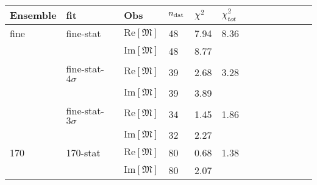 \begin{tabularx}{\textwidth}{XXXXXXXcccccc}
\toprule
 Ensemble & fit         & Obs            & $n_{\rm dat}$ & $\chi^2$  & $\chi^2_{tot}$  \\
\midrule
fine    & fine-stat       & $\text{Re}\left[\mathfrak{M}\right]$      &  48           & 7.94      & 8.36  \\
        &               & $\text{Im}\left[\mathfrak{M}\right]$      &  48           & 8.77      &       \\
        & fine-stat-$4\sigma$ & $\text{Re}\left[\mathfrak{M}\right]$      &  39           & 2.68      & 3.28  \\
        &               & $\text{Im}\left[\mathfrak{M}\right]$      &  39           & 3.89      &       \\ 
        & fine-stat-$3\sigma$  & $\text{Re}\left[\mathfrak{M}\right]$      &  34           & 1.45      & 1.86  \\
        &               & $\text{Im}\left[\mathfrak{M}\right]$      &  32           & 2.27      &       \\
\midrule
170    & 170-stat       & $\text{Re}\left[\mathfrak{M}\right]$       &  80           & 0.68      & 1.38  \\
       &               & $\text{Im}\left[\mathfrak{M}\right]$       &  80           & 2.07      &       \\


\end{tabularx}
